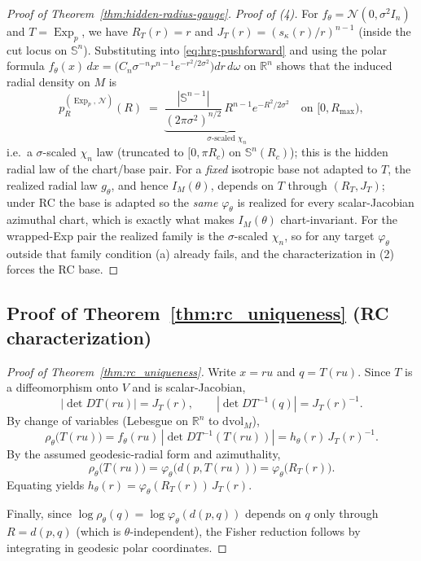 \documentclass{article}
\theoremstyle{definition}
\theoremstyle{remark}
\newcommand{\SSS}{\mathbb{S}}
\newcommand{\Exp}{\operatorname{Exp}}
\begin{document}
\begin{proof}[Proof of Theorem~\ref{thm:hidden-radius-gauge}]
\emph{Proof of (4).} For $f_\theta=\mathcal{N}(0,\sigma^2 I_n)$ and $T=\Exp_p$, we have
$R_T(r)=r$ and $J_T(r)=(s_\kappa(r)/r)^{n-1}$ (inside the cut locus on $\SSS^n$).
Substituting into \eqref{eq:hrg-pushforward} and using the polar formula
$f_\theta(x)\,dx=\bigl(C_n\sigma^{-n}r^{n-1}e^{-r^2/2\sigma^2}\bigr)dr\,d\omega$ on $\mathbb{R}^n$ shows
that the induced radial density on $M$ is
\[
p_R^{(\Exp_p,\,\mathcal{N})}(R)\;=\;
\underbrace{\frac{|\SSS^{n-1}|}{(2\pi\sigma^2)^{n/2}}\,R^{n-1}e^{-R^2/2\sigma^2}}_{\sigma\text{-scaled }\chi_n}
\quad\text{on }[0,R_{\max}),
\]
i.e.\ a $\sigma$-scaled $\chi_n$ law (truncated to $[0,\pi R_c)$ on $\SSS^n(R_c)$);
this is the hidden radial law of the chart/base pair. For a \emph{fixed} isotropic base not adapted to $T$, the realized radial law
$g_\theta$, and hence $I_M(\theta)$, depends on $T$ through $(R_T,J_T)$; under RC the base is
adapted so the \emph{same} $\varphi_\theta$ is realized for every scalar-Jacobian azimuthal chart,
which is exactly what makes $I_M(\theta)$ chart-invariant. For the wrapped-Exp pair the realized
family is the $\sigma$-scaled $\chi_n$, so for any target $\varphi_\theta$ outside that family
condition (a) already fails, and the characterization in (2) forces the RC base.
\end{proof}

\subsection{Proof of Theorem~\ref{thm:rc_uniqueness} (RC characterization)}
\label{app:proof_rc_uniqueness}

\begin{proof}[Proof of Theorem~\ref{thm:rc_uniqueness}]
Write $x=ru$ and $q=T(ru)$. Since $T$ is a diffeomorphism onto $V$ and is scalar-Jacobian,
\[
|\det DT(ru)| = J_T(r),
\qquad
|\det DT^{-1}(q)| = J_T(r)^{-1}.
\]
By change of variables (Lebesgue on $\mathbb{R}^n$ to $\mathrm{dvol}_M$),
\[
\rho_\theta\!\bigl(T(ru)\bigr)
= f_\theta(ru)\,|\det DT^{-1}(T(ru))|
= h_\theta(r)\,J_T(r)^{-1}.
\]
By the assumed geodesic-radial form and azimuthality,
\[
\rho_\theta\!\bigl(T(ru)\bigr)
=\varphi_\theta\!\bigl(d(p,T(ru))\bigr)
=\varphi_\theta\!\bigl(R_T(r)\bigr).
\]
Equating yields $h_\theta(r)=\varphi_\theta(R_T(r))\,J_T(r)$.

Finally, since $\log\rho_\theta(q)=\log\varphi_\theta(d(p,q))$ depends on $q$ only through
$R=d(p,q)$ (which is $\theta$-independent), the Fisher reduction follows by integrating
in geodesic polar coordinates.
\end{proof}
\end{document}
